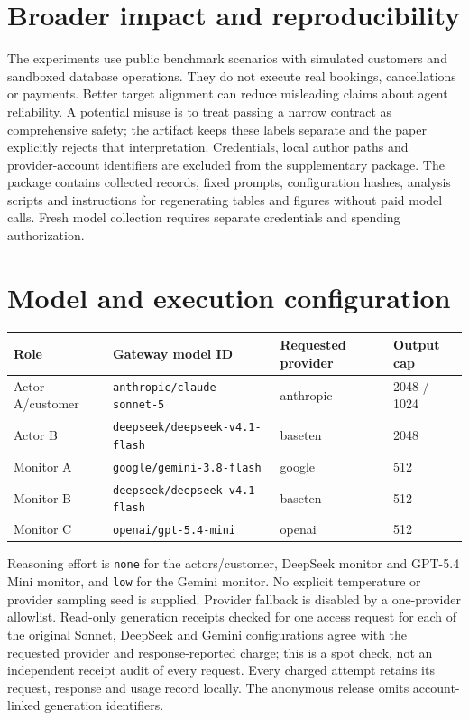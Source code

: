 \documentclass[10pt]{article}
\begin{document}
\section*{Broader impact and reproducibility}
The experiments use public benchmark scenarios with simulated customers and sandboxed database operations. They do not execute real bookings, cancellations or payments. Better target alignment can reduce misleading claims about agent reliability. A potential misuse is to treat passing a narrow contract as comprehensive safety; the artifact keeps these labels separate and the paper explicitly rejects that interpretation. Credentials, local author paths and provider-account identifiers are excluded from the supplementary package. The package contains collected records, fixed prompts, configuration hashes, analysis scripts and instructions for regenerating tables and figures without paid model calls. Fresh model collection requires separate credentials and spending authorization.




\appendix
\section{Model and execution configuration}
\label{app:configuration}
\begin{table}[h]
\centering\small
\begin{tabular}{llll}
\toprule
Role & Gateway model ID & Requested provider & Output cap\\
\midrule
Actor A/customer & \texttt{anthropic/claude-sonnet-5} & anthropic & 2048 / 1024\\
Actor B & \texttt{deepseek/deepseek-v4.1-flash} & baseten & 2048\\
Monitor A & \texttt{google/gemini-3.8-flash} & google & 512\\
Monitor B & \texttt{deepseek/deepseek-v4.1-flash} & baseten & 512\\
Monitor C & \texttt{openai/gpt-5.4-mini} & openai & 512\\
\bottomrule
\end{tabular}
\end{table}
Reasoning effort is \texttt{none} for the actors/customer, DeepSeek monitor and GPT-5.4 Mini monitor, and \texttt{low} for the Gemini monitor. No explicit temperature or provider sampling seed is supplied. Provider fallback is disabled by a one-provider allowlist. Read-only generation receipts checked for one access request for each of the original Sonnet, DeepSeek and Gemini configurations agree with the requested provider and response-reported charge; this is a spot check, not an independent receipt audit of every request. Every charged attempt retains its request, response and usage record locally. The anonymous release omits account-linked generation identifiers.
\end{document}
